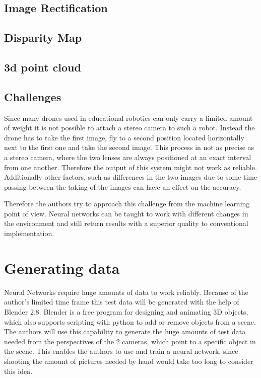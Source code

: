 \subsection{Image Rectification}

\subsection{Disparity Map}

\subsection{3d point cloud}

\subsection{Challenges}
Since many drones used in educational robotics can only carry a limited amount of weight it is not possible to attach a stereo camera to such a robot. Instead the drone has to take the first image, fly to a second position located horizontally next to the first one and take the second image. This process in not as precise as a stereo camera, where the two lenses are always positioned at an exact interval from one another. Therefore the output of this system might not work as reliable. Additionally other factors, such as differences in the two images due to some time passing between the taking of the images can have an effect on the accuracy.

Therefore the authors try to approach this challenge from the machine learning point of view. Neural networks can be taught to work with different changes in the environment and still return results with a superior quality to conventional implementation.

\section{Generating data}
Neural Networks require huge amounts of data to work reliably. Because of the author's limited time frame this test data will be generated with the help of Blender 2.8. Blender is a free program for designing and animating 3D objects, which also supports scripting with python to add or remove objects from a scene. The authors will use this capability to generate the huge amounts of test data needed from the perspectives of the 2 cameras, which point to a specific object in the scene. This enables the authors to use and train a neural network, since shooting the amount of pictures needed by hand would take too long to consider this idea.


